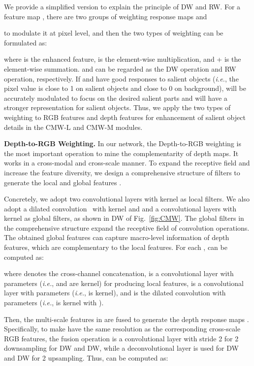 \documentclass[runningheads]{llncs}
\newcommand{\ie}{\emph{i.e.}}
\begin{document}
We provide a simplified version to explain the principle of
DW and RW.
For a feature map ,
there are two groups of  weighting response maps
 and

to modulate it at pixel level, and then the two types of weighting can be formulated as:

where 
is the enhanced feature,  is the element-wise multiplication,
and + is the element-wise summation.
 and
 can be regarded as the
DW operation and RW operation, respectively.
If  and  have good responses to
salient objects (\ie, the pixel value is close to 1 on salient objects
and close to 0 on background),  will be accurately
modulated to focus on the desired salient parts and 
will have a stronger representation for salient objects.
Thus, we apply the two types of weighting to RGB features
and depth features for enhancement of salient object details in the CMW-L and CMW-M
modules.




\noindent\textbf{Depth-to-RGB Weighting.}
In our network, the Depth-to-RGB weighting is the most important
operation to mine the complementarity of depth maps.
It works in a cross-modal and cross-scale manner.
To expand the receptive field and increase the feature diversity,
we design a comprehensive structure of filters to generate
the local and global features .





Concretely, we adopt two convolutional layers
with  kernel as local filters.
We also adopt a dilated convolution~\cite{Dila2016} with  kernel and 
and a convolutional layers with  kernel
as global filters, as shown in DW of Fig.~\ref{fig:CMW}.
The global filters in the comprehensive structure expand
the receptive field of convolution operations.
The obtained global features can capture macro-level information of depth
features, which are complementary to the local features.
For each ,  can be computed as:

where  denotes the cross-channel concatenation,
 is a convolutional layer with
parameters 
(\ie,  and  are  kernel)
for producing local features,
 is a convolutional layer with
parameters 
(\ie,  is  kernel),
and  is the dilated convolution with
parameters 
(\ie,  is  kernel with ).


Then, the multi-scale features in  are fused to generate
the depth response maps .
Specifically, to make  have the
same resolution as the corresponding cross-scale RGB features,
the fusion operation is a convolutional layer with stride 2 for 2 downsampling for DW and DW,
while a deconvolutional layer is used for DW and DW for 2 upsampling.
Thus,  can be computed as:
\end{document}
